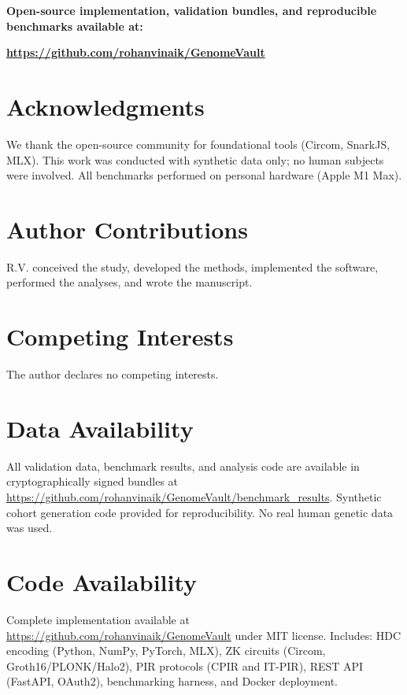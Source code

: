 \documentclass[11pt,a4paper]{article}
\begin{document}
\textbf{Open-source implementation, validation bundles, and reproducible benchmarks available at:}

\textbf{\url{https://github.com/rohanvinaik/GenomeVault}}

\section*{Acknowledgments}

We thank the open-source community for foundational tools (Circom, SnarkJS, MLX). This work was conducted with synthetic data only; no human subjects were involved. All benchmarks performed on personal hardware (Apple M1 Max).

\section*{Author Contributions}

R.V. conceived the study, developed the methods, implemented the software, performed the analyses, and wrote the manuscript.

\section*{Competing Interests}

The author declares no competing interests.

\section*{Data Availability}

All validation data, benchmark results, and analysis code are available in cryptographically signed bundles at \url{https://github.com/rohanvinaik/GenomeVault/benchmark_results}. Synthetic cohort generation code provided for reproducibility. No real human genetic data was used.

\section*{Code Availability}

Complete implementation available at \url{https://github.com/rohanvinaik/GenomeVault} under MIT license. Includes: HDC encoding (Python, NumPy, PyTorch, MLX), ZK circuits (Circom, Groth16/PLONK/Halo2), PIR protocols (CPIR and IT-PIR), REST API (FastAPI, OAuth2), benchmarking harness, and Docker deployment.
\end{document}
